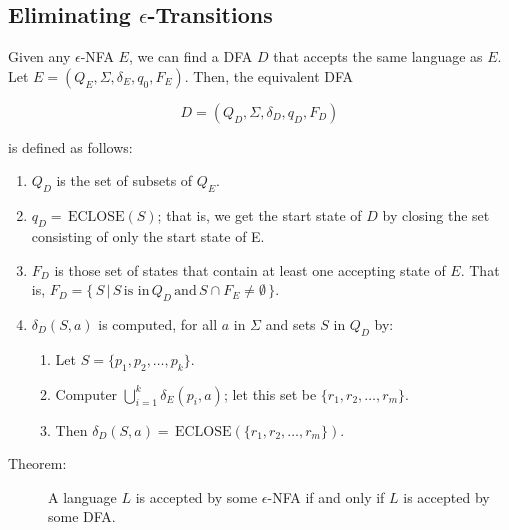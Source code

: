 \documentclass[]{article}
\begin{document}
  \subsection*{Eliminating $\epsilon$-Transitions}
    Given any $\epsilon$-NFA $E$, we can find a DFA $D$ that accepts the same
    language as $E$. Let $E = (Q_E, \Sigma, \delta_E, q_0, F_E)$. Then, the
    equivalent DFA

      \[ D = (Q_D, \Sigma, \delta_D, q_D, F_D) \]

    is defined as follows:
      \begin{enumerate}
        \item $Q_D$ is the set of subsets of $Q_E$.
        \item $q_D = \, \text{ECLOSE}(S)$; that is, we get the start state of
        $D$ by closing the set consisting of only the start state of E.
        \item $F_D$ is those set of states that contain at least one accepting
        state of $E$. That is, $F_D = \{ \, S \, | \, S \, \text{is in} \, Q_D
        \, \text{and} \, S \cap F_E \neq \emptyset \, \}$.
        \item $\delta_D(S,a)$ is computed, for all $a$ in $\Sigma$ and sets $S
        $ in $Q_D$ by:
          \begin{enumerate}
            \item Let $S = \{p_1, p_2, \ldots, p_k\}$.
            \item Computer $\bigcup^k_{i=1} \delta_E(p_i,a)$; let this set be
            $\{r_1, r_2, \ldots, r_m\}$.
            \item Then $\delta_D(S,a) = \, \text{ECLOSE}(\{r_1,r_2,\ldots,r_m
            \})$.
          \end{enumerate}
      \end{enumerate}
      \begin{description}
        \item[Theorem:] A language $L$ is accepted by some $\epsilon$-NFA if
        and only if $L$ is accepted by some DFA.
      \end{description}
\end{document}
